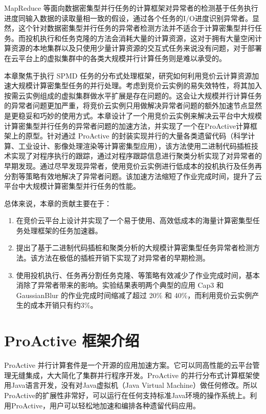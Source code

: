 MapReduce 等面向数据密集型并行任务的计算框架对异常者的检测基于任务执行进度同输入数据的读取量相一致的假设，通过各个任务的I/O进度识别异常者。显然，这个针对数据密集型并行任务的异常者检测方法并不适合于计算密集型并行任务。而投机执行和任务克隆的方法会消耗大量的计算资源，这对于拥有大量空闲计算资源的本地集群以及只使用少量计算资源的交互式任务来说没有问题，对于部署在云平台上的虚拟集群中的各类大规模并行计算任务则是难以承受的。

本章聚焦于执行 SPMD 任务的分布式处理框架，研究如何利用竞价云计算资源加速大规模计算密集型任务的并行处理。考虑到竞价云实例的易失效特性，将其加入按需云实例组成的虚拟集群做水平扩展是存在问题的。这会让大规模并行计算任务的异常者问题更加严重，将竞价云实例只用做解决异常者问题的额外加速节点显然是更稳妥和巧妙的使用方式。本章设计了一个用竞价云实例来解决云平台中大规模计算密集型并行任务的异常者问题的加速方法，并实现了一个在ProActive计算框架上的原型。针对通过 ProActive 的封装实现并行的大量各类遗留代码（科学计算、工业设计、影像处理渲染等计算密集型应用），该方法使用二进制代码插桩技术实现了对程序执行的跟踪，通过对程序跟踪信息进行聚类分析实现了对异常者的早期发现。通过尽早发现异常者，使用竞价云实例进行低成本的投机执行及任务再分割等策略有效地解决了异常者问题。该加速方法缩短了作业完成时间，提升了云平台中大规模计算密集型并行任务的性能。

总体来说，本章的贡献主要在于：
\begin{enumerate}
\item 在竞价云平台上设计并实现了一个易于使用、高效低成本的海量计算密集型任务处理框架的任务加速器。
\item 提出了基于二进制代码插桩和聚类分析的大规模计算密集型任务异常者检测方法。该方法在极低的插桩开销下实现了对异常者的早期检测。
\item 使用投机执行、任务再分割任务克隆、等策略有效减少了作业完成时间，基本消除了异常者带来的影响。实验结果表明两个典型的应用 Cap3 和 GaussianBlur 的作业完成时间缩减了超过 20\% 和 40\%，而利用竞价云实例产生的成本开销只有约3\%。
\end{enumerate}

\section{ProActive 框架介绍}
ProActive \cite{ProActive} 并行计算套件是一个开源的应用加速方案。它可以同高性能的云平台管理无缝集成，大大简化了集群并行程序开发。ProActive 的并行分布式计算框架使用Java语言开发，没有对Java虚拟机（Java Virtual Machine）做任何修改。所以 ProActive的扩展性非常好，可以运行在任何支持标准Java环境的操作系统上。利用ProActive，用户可以轻松地加速和编排各种遗留代码应用。

